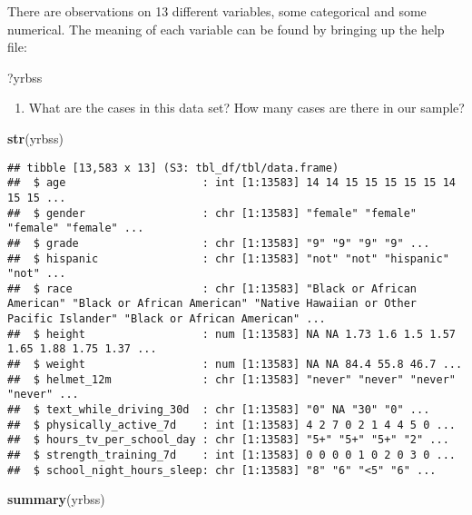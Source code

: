 \documentclass[
]{article}
\newenvironment{Shaded}{\begin{snugshade}}{\end{snugshade}}
\newcommand{\FunctionTok}[1]{\textcolor[rgb]{0.13,0.29,0.53}{\textbf{#1}}}
\newcommand{\NormalTok}[1]{#1}
\providecommand{\tightlist}{%
  \setlength{\itemsep}{0pt}\setlength{\parskip}{0pt}}
\begin{document}
There are observations on 13 different variables, some categorical and
some numerical. The meaning of each variable can be found by bringing up
the help file:

\begin{Shaded}
\begin{Highlighting}[]
\NormalTok{?yrbss}
\end{Highlighting}
\end{Shaded}

\begin{enumerate}
\def\labelenumi{\arabic{enumi}.}
\tightlist
\item
  What are the cases in this data set? How many cases are there in our
  sample?
\end{enumerate}

\begin{Shaded}
\begin{Highlighting}[]
\FunctionTok{str}\NormalTok{(yrbss)}
\end{Highlighting}
\end{Shaded}

\begin{verbatim}
## tibble [13,583 x 13] (S3: tbl_df/tbl/data.frame)
##  $ age                     : int [1:13583] 14 14 15 15 15 15 15 14 15 15 ...
##  $ gender                  : chr [1:13583] "female" "female" "female" "female" ...
##  $ grade                   : chr [1:13583] "9" "9" "9" "9" ...
##  $ hispanic                : chr [1:13583] "not" "not" "hispanic" "not" ...
##  $ race                    : chr [1:13583] "Black or African American" "Black or African American" "Native Hawaiian or Other Pacific Islander" "Black or African American" ...
##  $ height                  : num [1:13583] NA NA 1.73 1.6 1.5 1.57 1.65 1.88 1.75 1.37 ...
##  $ weight                  : num [1:13583] NA NA 84.4 55.8 46.7 ...
##  $ helmet_12m              : chr [1:13583] "never" "never" "never" "never" ...
##  $ text_while_driving_30d  : chr [1:13583] "0" NA "30" "0" ...
##  $ physically_active_7d    : int [1:13583] 4 2 7 0 2 1 4 4 5 0 ...
##  $ hours_tv_per_school_day : chr [1:13583] "5+" "5+" "5+" "2" ...
##  $ strength_training_7d    : int [1:13583] 0 0 0 0 1 0 2 0 3 0 ...
##  $ school_night_hours_sleep: chr [1:13583] "8" "6" "<5" "6" ...
\end{verbatim}

\begin{Shaded}
\begin{Highlighting}[]
\FunctionTok{summary}\NormalTok{(yrbss)}
\end{Highlighting}
\end{Shaded}
\end{document}
